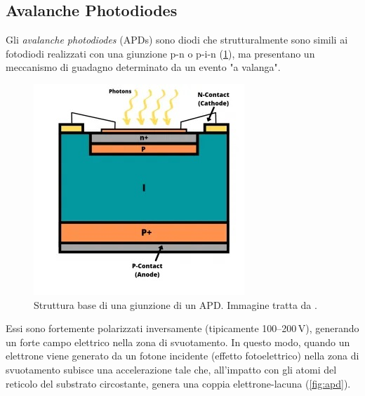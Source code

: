 \subsection{Avalanche Photodiodes}
Gli \textit{avalanche photodiodes} (APDs) sono diodi che strutturalmente sono simili ai fotodiodi realizzati con una giunzione p-n o p-i-n (\Fig\ref{fig:apd_pn}), ma presentano un meccanismo di guadagno determinato da un evento "a valanga". 
\begin{figure}[b]
	\centering
	\includegraphics[width=0.35\linewidth]{./ImageFiles/apd_2D.jpg}
	\caption{Struttura base di una giunzione di un APD. Immagine tratta da \cite{ApdImage}.}
	\label{fig:apd_pn}
\end{figure}
Essi sono fortemente polarizzati inversamente (tipicamente \numrange[range-phrase=--]{100}{200}\,\unit{\volt}), generando un forte campo elettrico nella zona di svuotamento. In questo modo, quando un elettrone viene generato da un fotone incidente (effetto fotoelettrico) nella zona di svuotamento subisce una accelerazione tale che, all'impatto con gli atomi del reticolo del substrato circostante, genera una coppia elettrone-lacuna (\Fig\ref{fig:apd}). 
